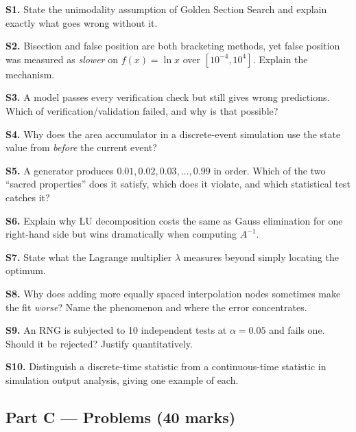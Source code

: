\begin{qabox}
\textbf{S1.} State the unimodality assumption of Golden Section Search and explain exactly what goes wrong without it.

\textbf{S2.} Bisection and false position are both bracketing methods, yet false position was measured as \emph{slower} on $f(x)=\ln x$ over $[10^{-4},10^4]$. Explain the mechanism.

\textbf{S3.} A model passes every verification check but still gives wrong predictions. Which of verification/validation failed, and why is that possible?

\textbf{S4.} Why does the area accumulator in a discrete-event simulation use the state value from \emph{before} the current event?

\textbf{S5.} A generator produces $0.01, 0.02, 0.03, \dots, 0.99$ in order. Which of the two ``sacred properties'' does it satisfy, which does it violate, and which statistical test catches it?

\textbf{S6.} Explain why LU decomposition costs the same as Gauss elimination for one right-hand side but wins dramatically when computing $A^{-1}$.

\textbf{S7.} State what the Lagrange multiplier $\lambda$ measures beyond simply locating the optimum.

\textbf{S8.} Why does adding more equally spaced interpolation nodes sometimes make the fit \emph{worse}? Name the phenomenon and where the error concentrates.

\textbf{S9.} An RNG is subjected to 10 independent tests at $\alpha = 0.05$ and fails one. Should it be rejected? Justify quantitatively.

\textbf{S10.} Distinguish a discrete-time statistic from a continuous-time statistic in simulation output analysis, giving one example of each.
\end{qabox}

\subsection{Part C --- Problems (40 marks)}

